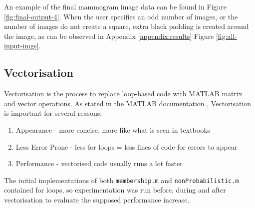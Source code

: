 An example of the final mammogram image data can be found in Figure \ref{fig:final-output-4}. When the user specifies an odd number of images, or the number of images do not create a square, extra black padding is created around the image, as can be observed in Appendix \ref{appendix:results} Figure \ref{fig:all-input-imgs}.


\subsection{Vectorisation}
\label{ssec:vectorisation}

Vectorisation is the process to replace loop-based code with MATLAB matrix and vector operations. As stated in the MATLAB documentation \cite{vectorisation}, Vectorisation is important for several reasons:

\begin{enumerate}
    \item Appearance - more concise, more like what is seen in textbooks
    \item Less Error Prone - less for loops = less lines of code for errors to appear
    \item Performance - vectorised code usually runs a lot faster
\end{enumerate}

The initial implementations of both \texttt{membership.m} and \texttt{nonProbabilistic.m} contained for loops, so experimentation was run before, during and after vectorisation to evaluate the supposed performance increase.

